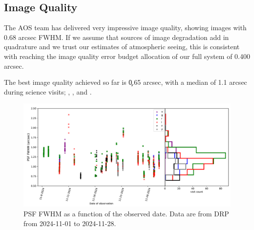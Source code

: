\subsection{Image Quality}
\label{sec:image_quality}

The AOS team has delivered very impressive image quality, showing images with 0.68 arcsec FWHM. If we assume
that sources of image degradation add in quadrature and we trust our estimates of atmospheric seeing, this is
consistent with reaching the image quality error budget allocation of our full system of 0.400 arcsec.

The best image quality achieved so far is \c 0.65 arcsec, with a median of 1.1 arcsec during science visits;
, , and .

\begin{figure}
  \centering
  \includegraphics[width=\textwidth]{figures/seeing}
  \caption{\small PSF FWHM as a function of the observed date. Data are from DRP from 2024-11-01 to 2024-11-28.}
  \label{fig:seeing_plot}
\end{figure}


